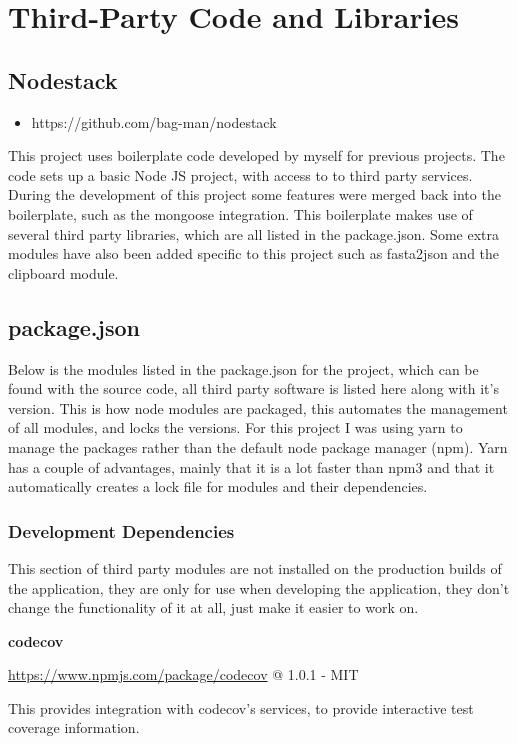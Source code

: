 \chapter{Third-Party Code and Libraries}
\section{Nodestack}
\begin{itemize}
  \item https://github.com/bag-man/nodestack
\end{itemize}
This project uses boilerplate code developed by myself for previous projects. The code sets up a basic Node JS project, with access to to third party services. During the development of this project some features were merged back into the boilerplate, such as the mongoose integration.  This boilerplate makes use of several third party libraries, which are all listed in the package.json. Some extra modules have also been added specific to this project such as fasta2json and the clipboard module. 


\section{package.json}
Below is the modules listed in the package.json for the project, which can be found with the source code, all third party software is listed here along with it's version. This is how node modules are packaged, this automates the management of all modules, and locks the versions. For this project I was using yarn\cite{yarn} to manage the packages rather than the default node package manager (npm)\cite{npm}. Yarn has a couple of advantages, mainly that it is a lot faster than npm3 and that it automatically creates a lock file for modules and their dependencies. 

\subsection{Development Dependencies}
  This section of third party modules are not installed on the production builds of the application, they are only for use when developing the application, they don't change the functionality of it at all, just make it easier to work on. 

\textbf{codecov} 

\url{https://www.npmjs.com/package/codecov} @ 1.0.1 - MIT

This provides integration with codecov's services, to provide interactive test coverage information.


